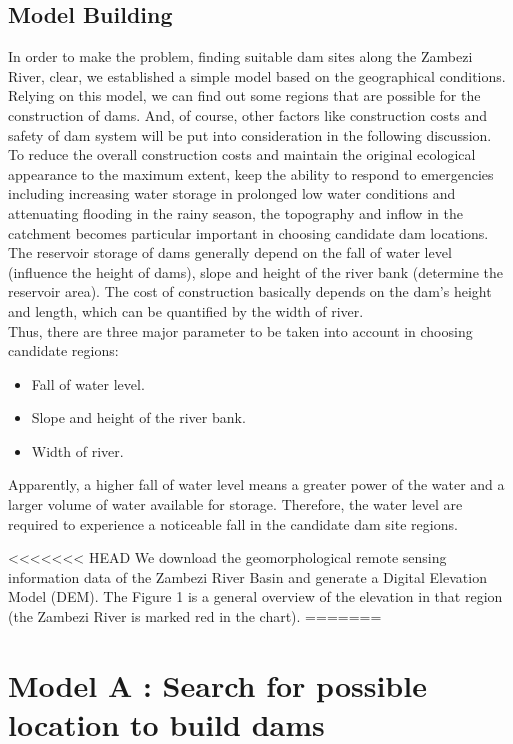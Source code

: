 \documentclass{mcmthesis}
\begin{document}
\subsection{Model Building}
\indent \indent In order to make the problem, finding suitable dam sites along the Zambezi River, clear, we established a simple model based on the geographical conditions. Relying on this model, we can find out some regions that are possible for the construction of dams. And, of course, other factors like construction costs and safety of dam system will be put into consideration in the following discussion.\\
\indent To reduce the overall construction costs and maintain the original ecological appearance to the maximum extent, keep the ability to respond to emergencies including increasing water storage in prolonged low water conditions and attenuating flooding in the rainy season, the topography and inflow in the catchment becomes particular important in choosing candidate dam locations.\\
\indent The reservoir storage of dams generally depend on the fall of water level (influence the height of dams), slope and height of the river bank (determine the reservoir area). The cost of construction basically depends on the dam’s height and length, which can be quantified by the width of river.\\ 
\indent Thus, there are three major parameter to be taken into account in choosing candidate regions:
\begin{itemize}
\item Fall of water level.
\item Slope and height of the river bank.
\item Width of river.
\end{itemize}

Apparently, a higher fall of water level means a greater power of the water and a larger volume of water available for storage. Therefore, the water level are required to experience a noticeable fall in the candidate dam site regions. 

<<<<<<< HEAD
We download the geomorphological remote sensing information data of the Zambezi River Basin and generate a Digital Elevation Model (DEM). The Figure 1 is a general overview of the elevation in that region (the Zambezi River is marked red in the chart).
=======
\section{Model A : Search for possible location to build dams }
\end{document}
